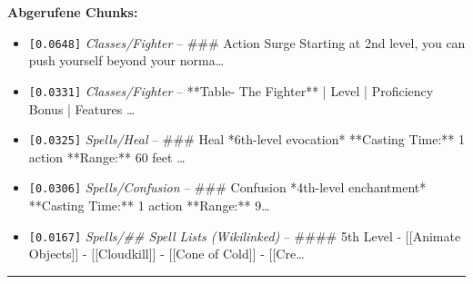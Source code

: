 \noindent\textbf{Abgerufene Chunks:}
\begin{itemize}[noitemsep, topsep=2pt]
  \item[\textbf{\#1}] \texttt{[0.0648]} \textit{Classes/Fighter} -- \#\#\# Action Surge  Starting at 2nd level, you can push yourself beyond your norma\ldots
  \item[\textbf{\#2}] \texttt{[0.0331]} \textit{Classes/Fighter} -- **Table- The Fighter**  | Level | Proficiency Bonus | Features                  \ldots
  \item[\textbf{\#3}] \texttt{[0.0325]} \textit{Spells/Heal} -- \#\#\# Heal  *6th-level evocation*  **Casting Time:** 1 action  **Range:** 60 feet \ldots
  \item[\textbf{\#4}] \texttt{[0.0306]} \textit{Spells/Confusion} -- \#\#\# Confusion  *4th-level enchantment*  **Casting Time:** 1 action  **Range:** 9\ldots
  \item[\textbf{\#5}] \texttt{[0.0167]} \textit{Spells/## Spell Lists (Wikilinked)} -- \#\#\#\# 5th Level  - [[Animate Objects]] - [[Cloudkill]] - [[Cone of Cold]] - [[Cre\ldots
\end{itemize}
\vspace{4pt}
\hrule
\vspace{6pt}
